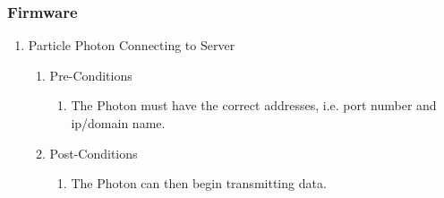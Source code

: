\documentclass{article}
\begin{document}
	\subsubsection{Firmware}
	\begin{enumerate}
		\item	Particle Photon Connecting to Server	
		\begin{enumerate}
			\item  Pre-Conditions
			\begin{enumerate}
				\item	The Photon must have the correct addresses, i.e. port number and ip/domain name.
			\end{enumerate}
			\item  Post-Conditions		
			\begin{enumerate}
				\item	The Photon can then begin transmitting data.
			\end{enumerate}
		\end{enumerate}
	\end{enumerate}
\end{document}
